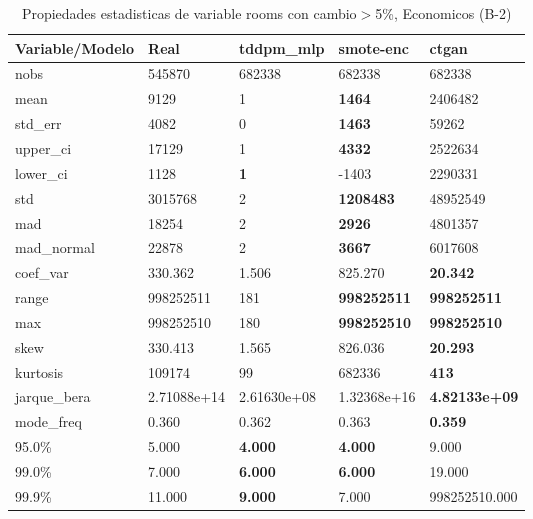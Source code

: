\begin{table}[H]
\centering
\fontsize{8}{14}\selectfont
\caption{Propiedades estadisticas de variable rooms con cambio\ensuremath{>}5\%, Economicos (B-2)}
\label{table-stats-economicos-b-2-rooms-short}
\begin{tabular}{|l|m{10em}|m{10em}|m{10em}|m{10em}|}
\hline
 \rowcolor[gray]{0.8}
Variable/Modelo & Real & tddpm\_mlp & smote-enc & ctgan \\
\hline nobs & 545870 & 682338 & 682338 & 682338 \\
\hline mean & 9129 & 1 & \bfseries 1464 & \cellcolor[rgb]{0.9, 0.54, 0.52} 2406482 \\
\hline std\_err & 4082 & 0 & \bfseries 1463 & \cellcolor[rgb]{0.9, 0.54, 0.52} 59262 \\
\hline upper\_ci & 17129 & 1 & \bfseries 4332 & \cellcolor[rgb]{0.9, 0.54, 0.52} 2522634 \\
\hline lower\_ci & 1128 & \bfseries 1 & -1403 & \cellcolor[rgb]{0.9, 0.54, 0.52} 2290331 \\
\hline std & 3015768 & 2 & \bfseries 1208483 & \cellcolor[rgb]{0.9, 0.54, 0.52} 48952549 \\
\hline mad & 18254 & 2 & \bfseries 2926 & \cellcolor[rgb]{0.9, 0.54, 0.52} 4801357 \\
\hline mad\_normal & 22878 & 2 & \bfseries 3667 & \cellcolor[rgb]{0.9, 0.54, 0.52} 6017608 \\
\hline coef\_var & 330.362 & 1.506 & \cellcolor[rgb]{0.9, 0.54, 0.52} 825.270 & \bfseries 20.342 \\
\hline range & 998252511 & \cellcolor[rgb]{0.9, 0.54, 0.52} 181 & \bfseries 998252511 & \bfseries 998252511 \\
\hline max & 998252510 & \cellcolor[rgb]{0.9, 0.54, 0.52} 180 & \bfseries 998252510 & \bfseries 998252510 \\
\hline skew & 330.413 & 1.565 & \cellcolor[rgb]{0.9, 0.54, 0.52} 826.036 & \bfseries 20.293 \\
\hline kurtosis & 109174 & 99 & \cellcolor[rgb]{0.9, 0.54, 0.52} 682336 & \bfseries 413 \\
\hline jarque\_bera & 2.71088e+14 & 2.61630e+08 & \cellcolor[rgb]{0.9, 0.54, 0.52} 1.32368e+16 & \bfseries 4.82133e+09 \\
\hline mode\_freq & 0.360 & 0.362 & \cellcolor[rgb]{0.9, 0.54, 0.52} 0.363 & \bfseries 0.359 \\
\hline 95.0\% & 5.000 & \bfseries 4.000 & \bfseries 4.000 & \cellcolor[rgb]{0.9, 0.54, 0.52} 9.000 \\
\hline 99.0\% & 7.000 & \bfseries 6.000 & \bfseries 6.000 & \cellcolor[rgb]{0.9, 0.54, 0.52} 19.000 \\
\hline 99.9\% & 11.000 & \bfseries 9.000 & 7.000 & \cellcolor[rgb]{0.9, 0.54, 0.52} 998252510.000 \\
\hline
\end{tabular}
\end{table}
